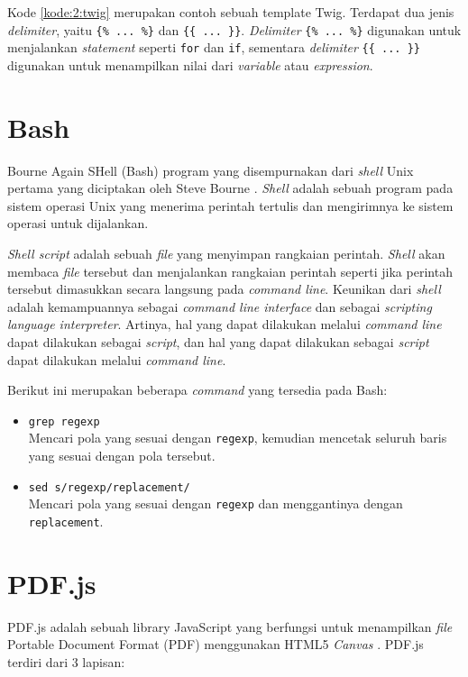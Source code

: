 Kode \ref{kode:2:twig} merupakan contoh sebuah template Twig. Terdapat dua jenis \textit{delimiter}, yaitu \verb|{% ... %}| dan \verb|{{ ... }}|. \textit{Delimiter} \verb|{% ... %}| digunakan untuk menjalankan \textit{statement} seperti \verb|for| dan \verb|if|, sementara \textit{delimiter} \verb|{{ ... }}| digunakan untuk menampilkan nilai dari \textit{variable} atau \textit{expression}.

\section{Bash}
\label{sec:2:shell}
Bourne Again SHell (Bash) program yang disempurnakan dari \textit{shell} Unix pertama yang diciptakan oleh Steve Bourne \cite{linux}. \textit{Shell} adalah sebuah program pada sistem operasi Unix yang menerima perintah tertulis dan mengirimnya ke sistem operasi untuk dijalankan. 

\textit{Shell script} adalah sebuah \textit{file} yang menyimpan rangkaian perintah. \textit{Shell} akan membaca \textit{file} tersebut dan menjalankan rangkaian perintah seperti jika perintah tersebut dimasukkan secara langsung pada \textit{command line}. Keunikan dari \textit{shell} adalah kemampuannya sebagai \textit{command line interface} dan sebagai  \textit{scripting language interpreter}. Artinya, hal yang dapat dilakukan melalui \textit{command line} dapat dilakukan sebagai \textit{script}, dan hal yang dapat dilakukan sebagai \textit{script} dapat dilakukan melalui \textit{command line}.

Berikut ini merupakan beberapa \textit{command} yang tersedia pada Bash:

\begin{itemize}
    \item \verb|grep regexp| \\ Mencari pola yang sesuai dengan \verb|regexp|, kemudian mencetak seluruh baris yang sesuai dengan pola tersebut.
    \item \verb|sed s/regexp/replacement/| \\ Mencari pola yang sesuai dengan \verb|regexp| dan menggantinya dengan \verb|replacement|.
\end{itemize}

\section{PDF.js}
\label{sec:2:pdfjs} 
PDF.js adalah sebuah library JavaScript yang berfungsi untuk menampilkan \textit{file} Portable Document Format (PDF) menggunakan HTML5 \textit{Canvas} \cite{pdfjs}. PDF.js terdiri dari 3 lapisan:

